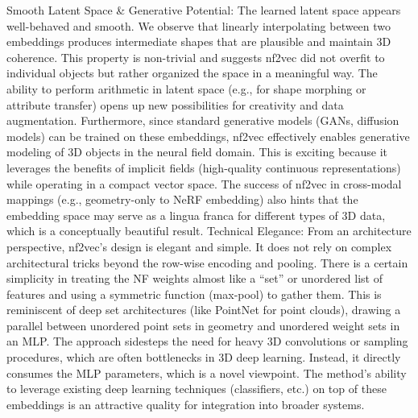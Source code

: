 \documentclass[11pt]{article}
\begin{document}
Smooth Latent Space & Generative Potential: The learned latent space appears well-behaved and smooth. We observe that linearly interpolating between two embeddings produces intermediate shapes that are plausible and maintain 3D coherence. This property is non-trivial and suggests nf2vec did not overfit to individual objects but rather organized the space in a meaningful way. The ability to perform arithmetic in latent space (e.g., for shape morphing or attribute transfer) opens up new possibilities for creativity and data augmentation. Furthermore, since standard generative models (GANs, diffusion models) can be trained on these embeddings, nf2vec effectively enables generative modeling of 3D objects in the neural field domain. This is exciting because it leverages the benefits of implicit fields (high-quality continuous representations) while operating in a compact vector space. The success of nf2vec in cross-modal mappings (e.g., geometry-only to NeRF embedding) also hints that the embedding space may serve as a lingua franca for different types of 3D data, which is a conceptually beautiful result.
Technical Elegance: From an architecture perspective, nf2vec’s design is elegant and simple. It does not rely on complex architectural tricks beyond the row-wise encoding and pooling. There is a certain simplicity in treating the NF weights almost like a “set” or unordered list of features and using a symmetric function (max-pool) to gather them. This is reminiscent of deep set architectures (like PointNet for point clouds), drawing a parallel between unordered point sets in geometry and unordered weight sets in an MLP. The approach sidesteps the need for heavy 3D convolutions or sampling procedures, which are often bottlenecks in 3D deep learning. Instead, it directly consumes the MLP parameters, which is a novel viewpoint. The method’s ability to leverage existing deep learning techniques (classifiers, etc.) on top of these embeddings is an attractive quality for integration into broader systems.
\end{document}
